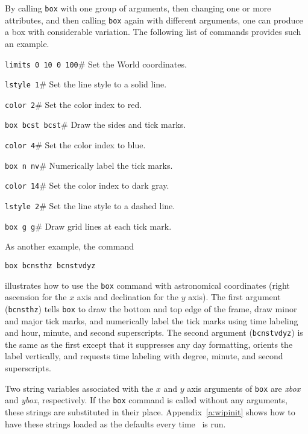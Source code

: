 By calling {\tt box} with one group of arguments, then changing one
or more attributes, and then calling {\tt box} again with different arguments,
one can produce a box with considerable variation.
The following list of commands provides such an example.
\begin{wiplist}%
  \item {\tt limits 0 10 0 100}\hfill\# Set the World coordinates.
  \item {\tt lstyle 1}\hfill\# Set the line style to a solid line.
  \item {\tt color 2}\hfill\# Set the color index to red.
  \item {\tt box bcst bcst}\hfill\# Draw the sides and tick marks.
  \item {\tt color 4}\hfill\# Set the color index to blue.
  \item {\tt box n nv}\hfill\# Numerically label the tick marks.
  \item {\tt color 14}\hfill\# Set the color index to dark gray.
  \item {\tt lstyle 2}\hfill\# Set the line style to a dashed line.
  \item {\tt box g g}\hfill\# Draw grid lines at each tick mark.
\end{wiplist}
As another example, the command
\begin{wiplist}%
  \item {\tt box bcnsthz bcnstvdyz}
\end{wiplist}
illustrates how to use the {\tt box} command with astronomical coordinates
(\ie right ascension for the $x$ axis and declination for the $y$ axis).
The first argument ({\tt bcnsthz}) tells {\tt box} to draw the bottom
and top edge of the frame, draw minor and major tick marks, and
numerically label the tick marks using time labeling and
hour, minute, and second superscripts.
The second argument ({\tt bcnstvdyz}) is the same as the first except that
it suppresses any day formatting, orients the label vertically, and
requests time labeling with degree, minute, and second superscripts.

Two string
variables associated with the $x$ and $y$ axis
arguments of {\tt box} are
{\em xbox} and
{\em ybox}, respectively.
If the {\tt box} command is called without any arguments,
these strings are substituted in their place.
Appendix~\ref{a:wipinit} shows how to have these strings loaded
as the defaults every time \wip\ is run.

